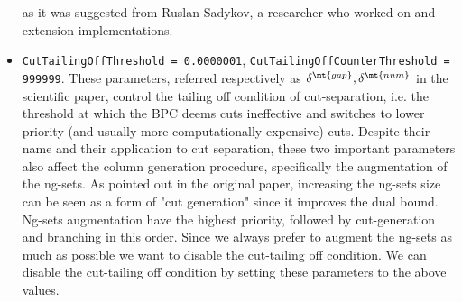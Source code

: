 \begin{itemize}
	      as it was suggested from Ruslan Sadykov,
	      a researcher who worked on \bapcod{} and \vrpsolver{} extension implementations.
	\item \texttt{CutTailingOffThreshold = 0.0000001}, \texttt{CutTailingOffCounterThreshold = 999999}.
	      These parameters, referred respectively as $\delta^\mt{gap}, \delta^\mt{num}$ in the scientific paper,
	      control the tailing off condition of cut-separation, i.e. the threshold
	      at which the BPC deems cuts ineffective and switches to lower priority
	      (and usually more computationally expensive) cuts.
	      Despite their name and their application to cut separation, these two important
	      parameters also affect the column generation procedure, specifically the augmentation of the ng-sets.
	      As pointed out in the original paper,
	      increasing the ng-sets size can be seen as a form of "cut generation"
	      since it improves the dual bound.
	      Ng-sets augmentation have the highest priority, followed by cut-generation and branching in this order.
	      Since we always prefer to augment the ng-sets as much as possible we want
	      to disable the cut-tailing off condition.
	      We can disable the cut-tailing off condition by setting these parameters to the above values.
\end{itemize}

\begin{comment}
[ About what is reduced cost fixing ]
[ Bucket arc elimination procedure = Reduced cost fixing procedure]
\textcite{sadykov2021}
VRPSolver extension includes an implementation of the pricing functor which
allows the user to define the subproblems as resource constrained shortest path
problems in graphs. The functor implements the bucket-graph based labeling
algorithm from paper [16] for solving the pricing problem, as well as the corre-
sponding bucket arc elimination procedure (i.e. reduced cost fixing procedure),
and the elementary route enumeration procedure [1]. VRPSolver extension also
implements cut separation functors for rounded cap
\end{comment}
